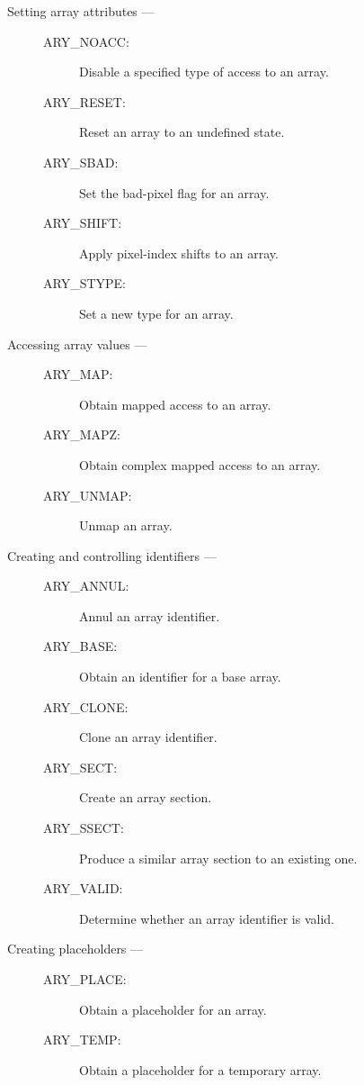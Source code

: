 \begin{description}
\item [Setting array attributes ---]

\begin{description}
\item [ARY\_NOACC:]  Disable a specified type of access to an array.
\item [ARY\_RESET:]  Reset an array to an undefined state.
\item [ARY\_SBAD:]  Set the bad-pixel flag for an array.
\item [ARY\_SHIFT:]  Apply pixel-index shifts to an array.
\item [ARY\_STYPE:]  Set a new type for an array.
\end{description}

\item [Accessing array values ---]

\begin{description}
\item [ARY\_MAP:]  Obtain mapped access to an array.
\item [ARY\_MAPZ:]  Obtain complex mapped access to an array.
\item [ARY\_UNMAP:]  Unmap an array.
\end{description}

\item [Creating and controlling identifiers ---]

\begin{description}
\item [ARY\_ANNUL:]  Annul an array identifier.
\item [ARY\_BASE:]  Obtain an identifier for a base array.
\item [ARY\_CLONE:]  Clone an array identifier.
\item [ARY\_SECT:]  Create an array section.
\item [ARY\_SSECT:]  Produce a similar array section to an existing one.
\item [ARY\_VALID:]  Determine whether an array identifier is valid.
\end{description}

\item [Creating placeholders ---]

\begin{description}
\item [ARY\_PLACE:]  Obtain a placeholder for an array.
\item [ARY\_TEMP:]  Obtain a placeholder for a temporary array.
\end{description}


\end{description}
